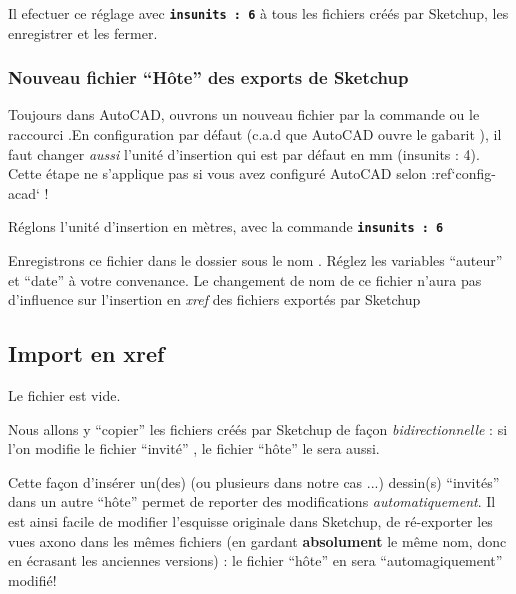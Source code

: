 \documentclass[a4paper,12pt,french]{sphinxmanual}
\begin{document}
Il efectuer ce réglage avec \textbf{\texttt{insunits : 6}} à tous les fichiers   créés par Sketchup, les enregistrer et les fermer.


\subsubsection{Nouveau fichier ``Hôte'' des exports de Sketchup}
\label{init_su+acad/acad1:nouveau-fichier-hote-des-exports-de-su}
Toujours dans AutoCAD, ouvrons un nouveau fichier par la commande  ou le raccourci .En configuration par défaut (c.a.d que AutoCAD ouvre le gabarit ), il faut changer \emph{aussi} l'unité d'insertion qui est par défaut en mm (insunits : 4). Cette étape ne s'applique pas si vous avez configuré AutoCAD selon :ref{}`config-acad{}` !

Réglons l'unité d'insertion en mètres, avec la commande \textbf{\texttt{insunits : 6}}

Enregistrons ce fichier dans le dossier  sous le nom . Réglez les variables ``auteur'' et ``date'' à votre convenance. Le changement de nom de ce fichier n'aura pas d'influence sur l'insertion en \emph{xref} des fichiers exportés par Sketchup


\subsection{Import en xref}
\label{init_su+acad/acad1:import-en-xref}
Le fichier   est vide.

Nous allons y ``copier'' les fichiers créés par Sketchup de façon \emph{bidirectionnelle} : si l'on modifie le fichier ``invité'' , le fichier ``hôte'' le sera aussi.

Cette façon d'insérer un(des) (ou plusieurs dans notre cas ...) dessin(s) ``invités'' dans un autre ``hôte'' permet de reporter des modifications \emph{automatiquement}. Il est ainsi facile de modifier l'esquisse originale dans Sketchup, de ré-exporter les vues axono dans les mêmes fichiers  (en gardant \textbf{absolument} le même nom, donc en écrasant les anciennes versions) : le fichier ``hôte'' en sera ``automagiquement'' modifié!
\end{document}
